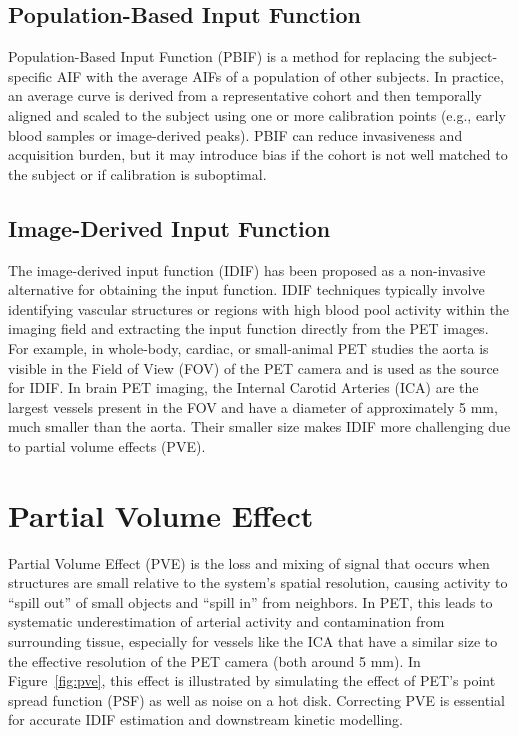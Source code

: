 \subsection{Population-Based Input Function}
Population-Based Input Function (PBIF) is a method for replacing the subject-specific AIF with the average AIFs of a population of other subjects.
In practice, an average curve is derived from a representative cohort and then temporally aligned and scaled to the subject using one or more calibration points (e.g., early blood samples or image-derived peaks).
PBIF can reduce invasiveness and acquisition burden, but it may introduce bias if the cohort is not well matched to the subject or if calibration is suboptimal.

\subsection{Image-Derived Input Function}
The image-derived input function (IDIF) has been proposed as a non-invasive alternative for obtaining the input function.
IDIF techniques typically involve identifying vascular structures or regions with high blood pool activity within the imaging field and extracting the input function directly from the PET images.
For example, in whole-body, cardiac, or small-animal PET studies the aorta is visible in the Field of View (FOV) of the PET camera and is used as the source for IDIF.
In brain PET imaging, the Internal Carotid Arteries (ICA) are the largest vessels present in the FOV and have a diameter of approximately 5 mm, much smaller than the aorta.
Their smaller size makes IDIF more challenging due to partial volume effects (PVE).

\section{Partial Volume Effect}\label{sec:pve}
Partial Volume Effect (PVE) is the loss and mixing of signal that occurs when structures are small relative to the system’s spatial resolution, causing activity to “spill out” of small objects and “spill in” from neighbors.
In PET, this leads to systematic underestimation of arterial activity and contamination from surrounding tissue, especially for vessels like the ICA that have a similar size to the effective resolution of the PET camera (both around 5 mm).
In Figure~\ref{fig:pve}, this effect is illustrated by simulating the effect of PET's point spread function (PSF) as well as noise on a hot disk.
Correcting PVE is essential for accurate IDIF estimation and downstream kinetic modelling.

